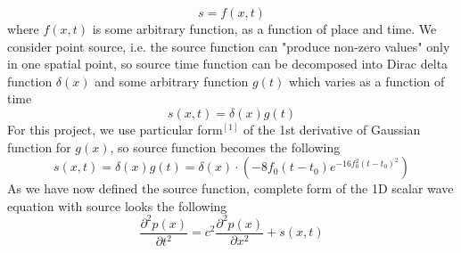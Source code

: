\documentclass[]{article}
\begin{document}
\begin{equation}
	s=f\left(x,t\right)
\end{equation}
where $f(x,t)$ is some arbitrary function, as a function of place and time. We consider point source, i.e. the source function can "produce non-zero values" only in one spatial point, so source time function can be decomposed into Dirac delta function $\delta\left(x\right)$ and some arbitrary function $g\left(t\right)$ which varies as a function of time
\begin{equation}
	s\left(x,t\right)=\delta\left(x\right)g\left(t\right)
\end{equation}
For this project, we use particular form$^{\left[1\right]}$ of the 1st derivative of Gaussian function for $g\left(x\right)$, so source function becomes the following
\begin{equation}
	s\left(x,t\right)=\delta\left(x\right)g\left(t\right)=\delta\left(x\right)\cdot\left(-8f_0\left(t-t_0\right)e^{-16f_0^2\left(t-t_0\right)^2}\right)
\end{equation}
As we have now defined the source function, complete form of the 1D scalar wave equation with source looks the following
\begin{equation}
	\frac{\partial^2 p\left(x\right)}{\partial t^2}=c^2\frac{\partial^2 p\left(x\right)}{\partial x^2}+s\left(x,t\right)
\end{equation}
\end{document}
